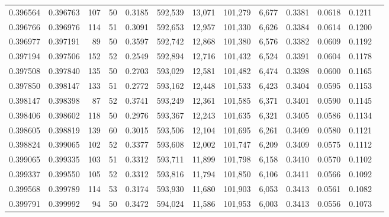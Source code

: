 \begin{tabular}{rrrrrrrrrrrrr}
0.396564 & 0.396763 &   107 &  50 &                                     0.3185 & 592,539 &  13,071 & 101,279 &   6,677 & 0.3381 & 0.0618 & 0.1211 \\
0.396766 & 0.396976 &   114 &  51 &                                     0.3091 & 592,653 &  12,957 & 101,330 &   6,626 & 0.3384 & 0.0614 & 0.1200 \\
0.396977 & 0.397191 &    89 &  50 &                                     0.3597 & 592,742 &  12,868 & 101,380 &   6,576 & 0.3382 & 0.0609 & 0.1192 \\
0.397194 & 0.397506 &   152 &  52 &                                     0.2549 & 592,894 &  12,716 & 101,432 &   6,524 & 0.3391 & 0.0604 & 0.1178 \\
0.397508 & 0.397840 &   135 &  50 &                                     0.2703 & 593,029 &  12,581 & 101,482 &   6,474 & 0.3398 & 0.0600 & 0.1165 \\
0.397850 & 0.398147 &   133 &  51 &                                     0.2772 & 593,162 &  12,448 & 101,533 &   6,423 & 0.3404 & 0.0595 & 0.1153 \\
0.398147 & 0.398398 &    87 &  52 &                                     0.3741 & 593,249 &  12,361 & 101,585 &   6,371 & 0.3401 & 0.0590 & 0.1145 \\
0.398406 & 0.398602 &   118 &  50 &                                     0.2976 & 593,367 &  12,243 & 101,635 &   6,321 & 0.3405 & 0.0586 & 0.1134 \\
0.398605 & 0.398819 &   139 &  60 &                                     0.3015 & 593,506 &  12,104 & 101,695 &   6,261 & 0.3409 & 0.0580 & 0.1121 \\
0.398824 & 0.399065 &   102 &  52 &                                     0.3377 & 593,608 &  12,002 & 101,747 &   6,209 & 0.3409 & 0.0575 & 0.1112 \\
0.399065 & 0.399335 &   103 &  51 &                                     0.3312 & 593,711 &  11,899 & 101,798 &   6,158 & 0.3410 & 0.0570 & 0.1102 \\
0.399337 & 0.399550 &   105 &  52 &                                     0.3312 & 593,816 &  11,794 & 101,850 &   6,106 & 0.3411 & 0.0566 & 0.1092 \\
0.399568 & 0.399789 &   114 &  53 &                                     0.3174 & 593,930 &  11,680 & 101,903 &   6,053 & 0.3413 & 0.0561 & 0.1082 \\
0.399791 & 0.399992 &    94 &  50 &                                     0.3472 & 594,024 &  11,586 & 101,953 &   6,003 & 0.3413 & 0.0556 & 0.1073 \\

\end{tabular}
